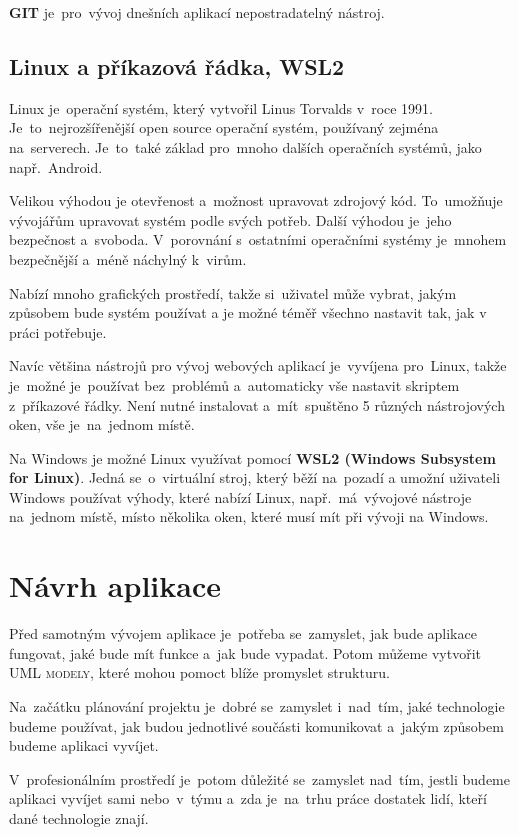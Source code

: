 \documentclass[14pt,a4paper]{article}
\begin{document}
        \textbf{GIT} je~pro~vývoj dnešních aplikací nepostradatelný nástroj. \parencite{gitscmBook}


        \subsection{Linux a příkazová řádka, WSL2}
        Linux je~operační systém, který vytvořil Linus Torvalds v~roce 1991. Je~to~nejrozšířenější open source operační systém,
        používaný zejména na~serverech. Je~to~také základ pro~mnoho dalších operačních systémů, jako např.~Android.
        
        Velikou výhodou je otevřenost a~možnost upravovat zdrojový kód. To~umožňuje vývojářům upravovat systém podle svých potřeb.
        Další výhodou je~jeho bezpečnost a~svoboda. V~porovnání s~ostatními operačními systémy je~mnohem bezpečnější a~méně náchylný k~virům.

        Nabízí mnoho grafických prostředí, takže si~uživatel může vybrat, jakým způsobem bude systém používat a je možné téměř
        všechno nastavit tak, jak v práci potřebuje.

        Navíc většina nástrojů pro vývoj webových aplikací je~vyvíjena pro~Linux, takže je~možné je~používat bez~problémů a~automaticky vše nastavit skriptem z~příkazové řádky. Není nutné instalovat a~mít~spuštěno 5 různých nástrojových oken, vše je~na~jednom místě.

        Na Windows je možné Linux využívat pomocí \textbf{WSL2 (Windows Subsystem for Linux)}. Jedná se~o~virtuální stroj, který běží na~pozadí a umožní uživateli Windows používat výhody, které nabízí Linux, např.~má~vývojové nástroje na~jednom místě, místo několika oken, které musí mít při vývoji na Windows.

	\section{Návrh aplikace}
        Před samotným vývojem aplikace je~potřeba se~zamyslet, jak bude aplikace fungovat, jaké bude mít funkce a~jak bude vypadat. Potom můžeme vytvořit \textsc{UML modely}, které mohou pomoct blíže promyslet strukturu.

        Na~začátku plánování projektu je~dobré se~zamyslet i~nad~tím, jaké technologie budeme používat, jak budou jednotlivé součásti komunikovat a~jakým způsobem budeme aplikaci vyvíjet.
    
        V~profesionálním prostředí je~potom důležité se~zamyslet nad~tím, jestli budeme aplikaci vyvíjet sami nebo~v~týmu a~zda je~na~trhu práce dostatek lidí, kteří dané technologie znají.
\end{document}
